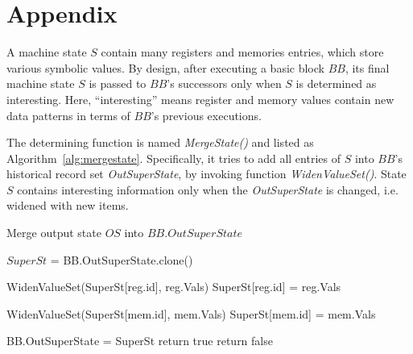 \section*{Appendix}

A machine state $S$ contain many registers and memories entries, which store various symbolic values.
By design, after executing a basic block $BB$,
its final machine state $S$ is passed to $BB$'s successors only when $S$ is determined as interesting.
Here, ``interesting'' means register and memory values contain new data patterns in terms of $BB$'s previous executions.

The determining function is named \textit{MergeState()} and listed as Algorithm~\ref{alg:mergestate}.
Specifically, it tries to add all entries of $S$ into $BB$'s historical record set \textit{OutSuperState}, by invoking function \textit{WidenValueSet()}.
State $S$ contains interesting information only when the \textit{OutSuperState} is changed, i.e. widened with new items.

\begin{algorithm}
    \caption{Merge output state $OS$ into $BB.OutSuperState$ }
    \footnotesize
    \begin{algorithmic}[1]
        \State $SuperSt$ = BB.OutSuperState.clone()

        \State
         
        \State WidenValueSet(SuperSt[reg.id], reg.Vals)
        \Else
        \State SuperSt[reg.id] = reg.Vals
        \EndIf
        \EndFor

        \State
         
        \State WidenValueSet(SuperSt[mem.id], mem.Vals)
        \Else
        \State SuperSt[mem.id] = mem.Vals
        \EndIf
        \EndFor

        \State
         
        \State BB.OutSuperState = SuperSt 
        \State return true 
        \EndIf
        \State return false 
        \EndFunction
    \end{algorithmic}
    \label{alg:mergestate}
\end{algorithm}


